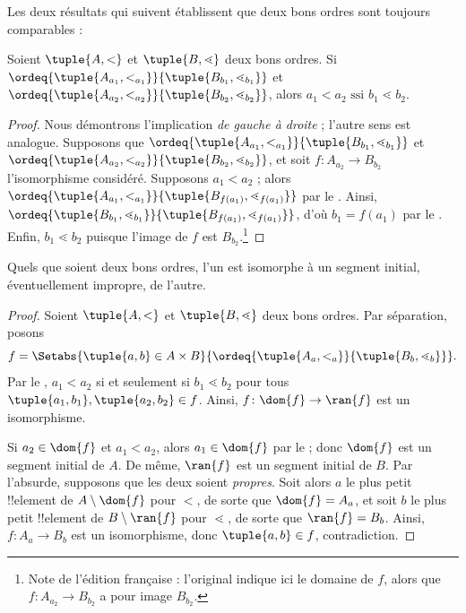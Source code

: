 \documentclass[../../../include/open-logic-section]{subfiles}
\begin{document}
Les deux résultats qui suivent établissent que deux bons ordres sont
toujours comparables :

\begin{lem}
Soient $\tuple{A, <}$ et $\tuple{B, \lessdot}$ deux bons ordres. Si
$\ordeq{\tuple{A_{a_1}, <_{a_1}}}{\tuple{B_{b_1}, \lessdot_{b_1}}}$
et $\ordeq{\tuple{A_{{a_2}}, <_{a_2}}}{\tuple{B_{{b_2}},
\lessdot_{b_2}}}$, alors ${a_1} < {a_2} \text{ ssi }{b_1} \lessdot
{b_2}$.
\end{lem}

\begin{proof}
Nous démontrons l'implication \emph{de gauche à droite} ; l'autre sens
est analogue. Supposons que
$\ordeq{\tuple{A_{a_1}, <_{a_1}}}{\tuple{B_{b_1},
\lessdot_{b_1}}}$ et
$\ordeq{\tuple{A_{{a_2}}, <_{a_2}}}{\tuple{B_{{b_2}},
\lessdot_{b_2}}}$, et soit $f \colon A_{{a_2}} \to B_{{b_2}}$
l'isomorphisme considéré. Supposons ${a_1} < {a_2}$ ; alors
$\ordeq{\tuple{A_{a_1}, <_{a_1}}}{\tuple{B_{f({a_1})},
\lessdot_{f({a_1})}}}$ par le . Ainsi,
$\ordeq{\tuple{B_{b_1}, \lessdot_{b_1}}}{\tuple{B_{f({a_1})},
\lessdot_{f({a_1})}}}$, d'où ${b_1} = f({a_1})$ par le
. Enfin, ${b_1} \lessdot {b_2}$ puisque
l'image de $f$ est $B_{{b_2}}$.\footnote{Note de l'édition
française : l'original indique ici le domaine de $f$, alors que
$f \colon A_{a_2} \to B_{b_2}$ a pour image $B_{b_2}$.}
\end{proof}

\begin{thm}
Quels que soient deux bons ordres, l'un est isomorphe à un segment
initial, éventuellement impropre, de l'autre.
\end{thm}

\begin{proof}
Soient $\tuple{A, <}$ et $\tuple{B, \lessdot}$ deux bons ordres.
Par séparation, posons
\[
	f = \Setabs{\tuple{a, b} \in A \times B}{
		\ordeq{\tuple{A_a, <_a}}{\tuple{B_b, \lessdot_b}}}.
\]
Par le , $a_1 < a_2$ si et seulement si
$b_1 \lessdot b_2$ pour tous
$\tuple{a_1, b_1}, \tuple{a_2, b_2} \in f$. Ainsi,
$f \colon \dom{f} \to \ran{f}$ est un isomorphisme.

Si $a_2 \in \dom{f}$ et $a_1 < a_2$, alors $a_1 \in \dom{f}$ par le
 ; donc $\dom{f}$ est un segment initial
de $A$. De même, $\ran{f}$ est un segment initial de $B$. Par
l'absurde, supposons que les deux soient \emph{propres}. Soit alors
$a$ le plus petit !!{element} de $A \setminus \dom{f}$ pour $<$, de
sorte que $\dom{f} = A_a$, et soit $b$ le plus petit !!{element} de
$B \setminus \ran{f}$ pour $\lessdot$, de sorte que $\ran{f} = B_b$.
Ainsi, $f \colon A_a \to B_b$ est un isomorphisme, donc
$\tuple{a, b} \in f$, contradiction.
\end{proof}
\end{document}
